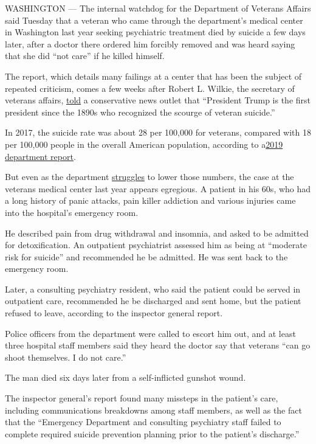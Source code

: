 WASHINGTON --- The internal watchdog for the Department of Veterans
Affairs said Tuesday that a veteran who came through the department's
medical center in Washington last year seeking psychiatric treatment
died by suicide a few days later, after a doctor there ordered him
forcibly removed and was heard saying that she did ``not care'' if he
killed himself.

The report, which details many failings at a center that has been the
subject of repeated criticism, comes a few weeks after Robert L. Wilkie,
the secretary of veterans affairs,
\href{https://www.stripes.com/news/us/wilkie-trump-is-the-first-president-since-1890s-to-recognize-veteran-suicide-crisis-1.637847}{told}
a conservative news outlet that ``President Trump is the first president
since the 1890s who recognized the scourge of veteran suicide.''

In 2017, the suicide rate was about 28 per 100,000 for veterans,
compared with 18 per 100,000 people in the overall American population,
according to
a\href{https://www.mentalhealth.va.gov/docs/data-sheets/2019/2019_National_Veteran_Suicide_Prevention_Annual_Report_508.pdf}{2019
department report}.

But even as the department
\href{https://www.nytimes.com/2019/04/14/us/politics/veterans-suicide.html}{struggles}
to lower those numbers, the case at the veterans medical center last
year appears egregious. A patient in his 60s, who had a long history of
panic attacks, pain killer addiction and various injuries came into the
hospital's emergency room.

He described pain from drug withdrawal and insomnia, and asked to be
admitted for detoxification. An outpatient psychiatrist assessed him as
being at ``moderate risk for suicide'' and recommended he be admitted.
He was sent back to the emergency room.

Later, a consulting psychiatry resident, who said the patient could be
served in outpatient care, recommended he be discharged and sent home,
but the patient refused to leave, according to the inspector general
report.

Police officers from the department were called to escort him out, and
at least three hospital staff members said they heard the doctor say
that veterans ``can go shoot themselves. I do not care.''

The man died six days later from a self-inflicted gunshot wound.

The inspector general's report found many missteps in the patient's
care, including communications breakdowns among staff members, as well
as the fact that the ``Emergency Department and consulting psychiatry
staff failed to complete required suicide prevention planning prior to
the patient's discharge.''

